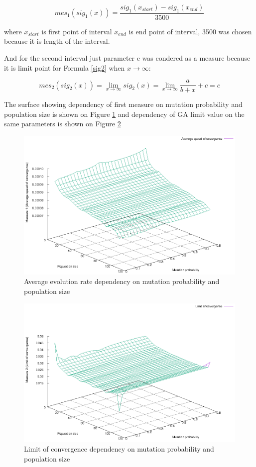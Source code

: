 \documentclass[12pt]{report}
\begin{document}
\begin{equation} \label{mes1}
mes_1(sig_1(x)) = \frac{sig_1(x_{start}) - sig_1({x_{end}})}{3500}
\end{equation}
\bigbreak
 
where $x_{start}$ is first point of interval $x_{end}$ is end point of interval, 3500 was chosen because it is length of the interval.

And for the second interval just parameter c was condered as a measure because it is limit point for Formula \ref{sig2} when $x \rightarrow \infty$:

\begin{equation} \label{mes2}
mes_2(sig_2(x)) = \lim_{x\to\infty} sig_2(x) = \lim_{x\to\infty}  \frac{a}{b+x}+c = c
\end{equation}
\bigbreak

The surface showing dependency of first measure on mutation probability and population size is shown on Figure \ref{speedsurface} and dependency of GA limit value on the same parameters is shown on Figure \ref{limitsurface}

\begin{figure}
    \centering
    \includegraphics[width=5.0in]{speed_surface}
    \caption{Average evolution rate dependency on mutation probability and population size}
    \label{speedsurface}
\end{figure}

\begin{figure}
    \centering
    \includegraphics[width=5.0in]{limit_surface}
    \caption{Limit of convergence dependency on mutation probability and population size}
    \label{limitsurface}
\end{figure}
\end{document}

